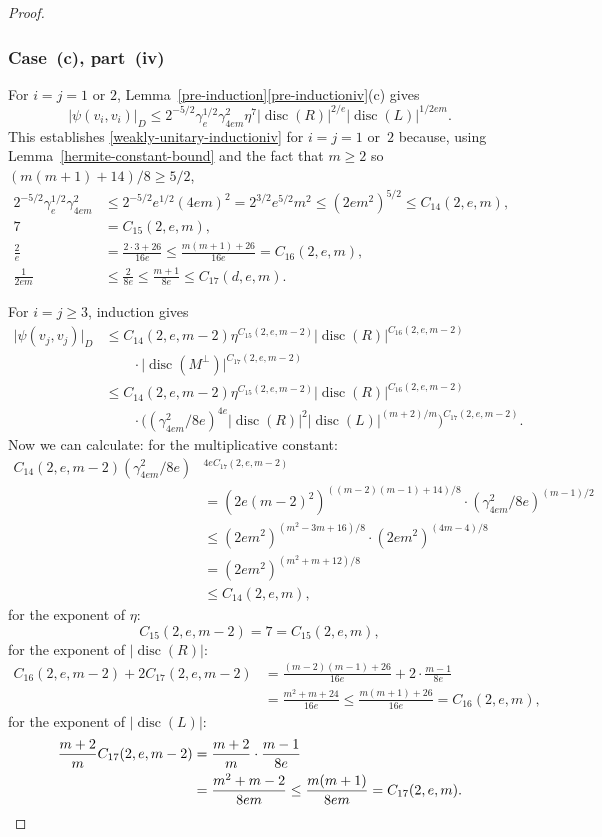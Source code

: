 \documentclass[JEP,XML,SOM,Unicode,NoFloatCountersInSection]{cedram}
\DeclareMathOperator{\disc}{disc}
\newcommand{\abs}[1]{\lvert #1 \rvert}
\begin{document}
\begin{proof}
\subsubsection*{Case~(c), part~(iv)}
For $i=j=1$ or $2$, Lemma~\ref{pre-induction}\eqref{pre-inductioniv}(c) gives
\begin{equation} \label{eqn:case-c-iv-base}
\abs{\psi(v_i, v_i)}_D \leq 2^{-5/2} \gamma_e^{1/2} \gamma_{4em}^2 \eta^7 \abs{\disc(R)}^{2/e} \abs{\disc(L)}^{1/2em}.
\end{equation}
This establishes \eqref{weakly-unitary-inductioniv} for $i=j=1$ or~$2$ because, using Lemma~\ref{hermite-constant-bound} and the fact that $m \geq 2$ so $(m(m+1)+14)/8 \geq 5/2$,
\begin{align*}
2^{-5/2} \gamma_e^{1/2} \gamma_{4em}^2
& \leq 2^{-5/2} e^{1/2} (4em)^2
= 2^{3/2} e^{5/2} m^2
\leq (2em^2)^{5/2}
\leq C_{14}(2,e,m),
\\[3pt]
7 & = C_{15}(2,e,m),
\\ \frac{2}{e} & = \frac{2 \cdot 3 + 26}{16e} \leq \frac{m(m+1) + 26}{16e} = C_{16}(2,e,m),
\\ \frac{1}{2em} & \leq \frac{2}{8e} \leq \frac{m+1}{8e} \leq C_{17}(d,e,m).
\end{align*}

For $i=j \geq 3$, induction gives
\begin{align*}
\abs{\psi(v_j, v_j)}_D
& \leq C_{14}(2,e,m-2) \eta^{C_{15}(2,e,m-2)} \abs{\disc(R)}^{C_{16}(2,e,m-2)}
\\& \qquad \cdot \abs{\disc(M^\perp)}^{C_{17}(2,e,m-2)}
\\& \leq C_{14}(2,e,m-2) \eta^{C_{15}(2,e,m-2)} \abs{\disc(R)}^{C_{16}(2,e,m-2)}
\\& \qquad \cdot \bigl( (\gamma_{4em}^2/8e)^{4e} \abs{\disc(R)}^2 \abs{\disc(L)}^{(m+2)/m} \bigr)^{C_{17}(2,e,m-2)}.
\end{align*}
Now we can calculate:
for the multiplicative constant:
\begin{align*}
C_{14}(2,e,m-2) (\gamma_{4em}^2/8e)&^{4eC_{17}(2,e,m-2)}
\\& = (2e(m-2)^2)^{((m-2)(m-1)+14)/8} \cdot (\gamma_{4em}^2/8e)^{(m-1)/2}
\\& \leq (2em^2)^{(m^2-3m+16)/8} \cdot (2em^2)^{(4m-4)/8}
\\& = (2em^2)^{(m^2+m+12)/8}
\\& \leq C_{14}(2,e,m),
\end{align*}
for the exponent of $\eta$:
\[
C_{15}(2,e,m-2) = 7 = C_{15}(2,e,m),
\]
for the exponent of $\abs{\disc(R)}$:
\begin{align*}
C_{16}(2,e,m-2) + 2C_{17}(2,e,m-2)
& = \frac{(m-2)(m-1)+26}{16e} + 2 \cdot \frac{m-1}{8e}
\\& = \frac{m^2+m+24}{16e}
\!\leq\! \frac{m(m+1)+26}{16e}
= C_{16}(2,e,m),
\end{align*}
for the exponent of $\abs{\disc(L)}$:
\begin{align*}
\frac{m+2}{m} C_{17}(2,e,m-2)
& = \frac{m+2}{m} \cdot \frac{m-1}{8e}
\\& = \frac{m^2+m-2}{8em}
\leq \frac{m(m+1)}{8em}
= C_{17}(2,e,m).
\qedhere
\end{align*}
\end{proof}
\end{document}
